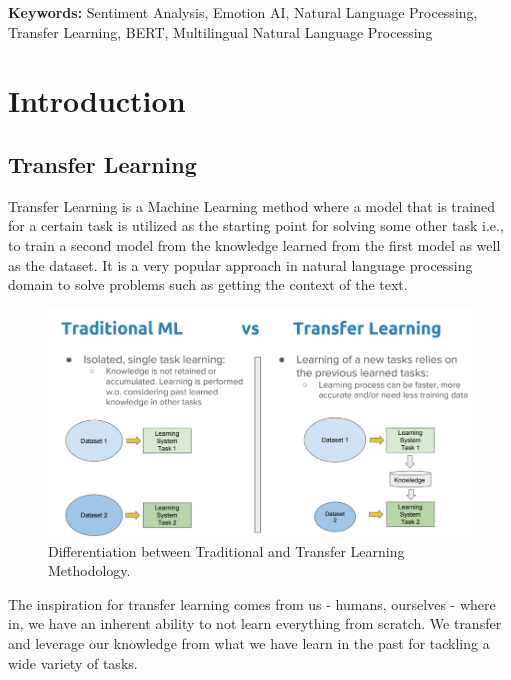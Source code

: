 \documentclass[a4paper, 12pt]{article}
\begin{document}
\begin{sloppypar}
\textbf{Keywords:} Sentiment Analysis, Emotion AI,  Natural Language Processing, Transfer Learning, BERT, Multilingual Natural Language Processing
\thispagestyle{empty}
\clearpage
\tableofcontents
\thispagestyle{empty}
\clearpage
\setcounter{page}{1}
\section{Introduction}

\subsection{Transfer Learning}
Transfer Learning is a Machine Learning method where a model that is trained for a certain task is utilized as the starting point for solving some other task i.e., to train a second model from the knowledge learned from the first model as well as the dataset. It is a very popular approach in natural language processing domain to solve problems such as getting the context of the text.

\begin{figure}[H]
\begin{center}
\includegraphics[scale=0.45]{tl.png}
\caption{Differentiation between Traditional and Transfer Learning Methodology. \label{tl}} %
\end{center}
\end{figure}

The inspiration for transfer learning comes from us - humans, ourselves - where in, we have an inherent ability to not learn everything from scratch. We transfer and leverage our knowledge from what we have learn in the past for tackling a wide variety of tasks.\cite{sarkar_deep_2018}


\end{sloppypar}
\end{document}
